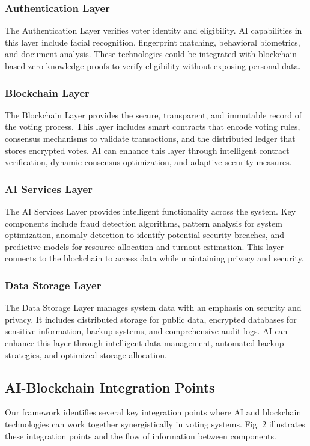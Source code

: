 \documentclass[conference]{IEEEtran}
\begin{document}
\subsubsection{Authentication Layer}
The Authentication Layer verifies voter identity and eligibility. AI capabilities in this layer include facial recognition, fingerprint matching, behavioral biometrics, and document analysis. These technologies could be integrated with blockchain-based zero-knowledge proofs to verify eligibility without exposing personal data.

\subsubsection{Blockchain Layer}
The Blockchain Layer provides the secure, transparent, and immutable record of the voting process. This layer includes smart contracts that encode voting rules, consensus mechanisms to validate transactions, and the distributed ledger that stores encrypted votes. AI can enhance this layer through intelligent contract verification, dynamic consensus optimization, and adaptive security measures.

\subsubsection{AI Services Layer}
The AI Services Layer provides intelligent functionality across the system. Key components include fraud detection algorithms, pattern analysis for system optimization, anomaly detection to identify potential security breaches, and predictive models for resource allocation and turnout estimation. This layer connects to the blockchain to access data while maintaining privacy and security.

\subsubsection{Data Storage Layer}
The Data Storage Layer manages system data with an emphasis on security and privacy. It includes distributed storage for public data, encrypted databases for sensitive information, backup systems, and comprehensive audit logs. AI can enhance this layer through intelligent data management, automated backup strategies, and optimized storage allocation.

\subsection{AI-Blockchain Integration Points}
Our framework identifies several key integration points where AI and blockchain technologies can work together synergistically in voting systems. Fig. 2 illustrates these integration points and the flow of information between components.
\end{document}
